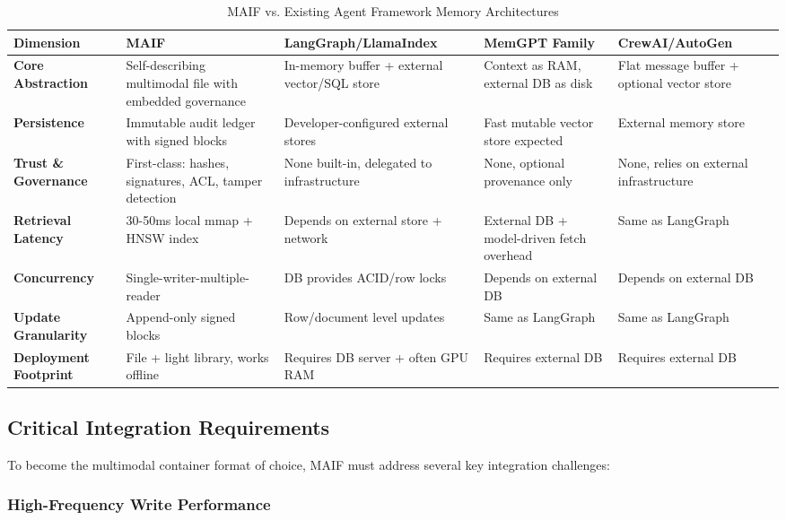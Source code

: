 \documentclass[conference]{IEEEtran}
\begin{document}
\begin{table*}[!t]
\renewcommand{\arraystretch}{1.3}
\caption{MAIF vs. Existing Agent Framework Memory Architectures}
\label{tab:framework-comparison}
\centering
\tiny
\begin{tabular}{p{2.5cm}p{3cm}p{3cm}p{3cm}p{3cm}}
\toprule
\textbf{Dimension} & \textbf{MAIF} & \textbf{LangGraph/LlamaIndex} & \textbf{MemGPT Family} & \textbf{CrewAI/AutoGen} \\
\midrule
\textbf{Core Abstraction} & Self-describing multimodal file with embedded governance & In-memory buffer + external vector/SQL store & Context as RAM, external DB as disk & Flat message buffer + optional vector store \\
\textbf{Persistence} & Immutable audit ledger with signed blocks & Developer-configured external stores & Fast mutable vector store expected & External memory store \\
\textbf{Trust \& Governance} & First-class: hashes, signatures, ACL, tamper detection & None built-in, delegated to infrastructure & None, optional provenance only & None, relies on external infrastructure \\
\textbf{Retrieval Latency} & 30-50ms local mmap + HNSW index & Depends on external store + network & External DB + model-driven fetch overhead & Same as LangGraph \\
\textbf{Concurrency} & Single-writer-multiple-reader & DB provides ACID/row locks & Depends on external DB & Depends on external DB \\
\textbf{Update Granularity} & Append-only signed blocks & Row/document level updates & Same as LangGraph & Same as LangGraph \\
\textbf{Deployment Footprint} & File + light library, works offline & Requires DB server + often GPU RAM & Requires external DB & Requires external DB \\
\bottomrule
\end{tabular}
\end{table*}

\subsection{Critical Integration Requirements}

To become the multimodal container format of choice, MAIF must address several key integration challenges:

\subsubsection{High-Frequency Write Performance}
\end{document}
